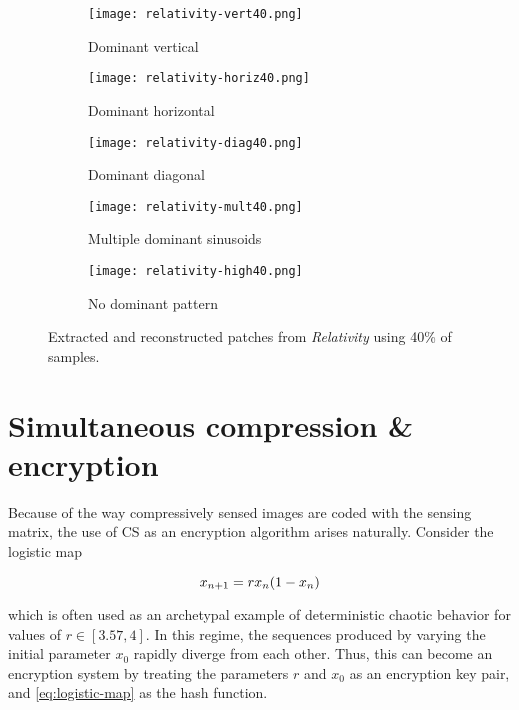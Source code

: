 \begin{figure}[htb]
	\centering
	\begin{subfigure}{\textwidth}
		\centering
		\texttt{[image: relativity-vert40.png]}
		\caption{Dominant vertical}
		\label{fig:relativity-vert40}
	\end{subfigure}
	\begin{subfigure}{\textwidth}
		\centering
		\texttt{[image: relativity-horiz40.png]}
		\caption{Dominant horizontal}
		\label{fig:relativity-horiz40}
	\end{subfigure}
	\begin{subfigure}{\textwidth}
		\centering
		\texttt{[image: relativity-diag40.png]}
		\caption{Dominant diagonal}
		\label{fig:relativity-diag40}
	\end{subfigure}
	\begin{subfigure}{\textwidth}
		\centering
		\texttt{[image: relativity-mult40.png]}
		\caption{Multiple dominant sinusoids}
		\label{fig:relativity-mult40}
	\end{subfigure}
	\begin{subfigure}{\textwidth}
		\centering
		\texttt{[image: relativity-high40.png]}
		\caption{No dominant pattern}
		\label{fig:relativity-high40}
	\end{subfigure}
	\caption{Extracted and reconstructed patches from \textit{Relativity} using 40\% of samples.}
	\label{fig:relativity-dominant-slices}
\end{figure}


\section{Simultaneous compression \& encryption}
Because of the way compressively sensed images are coded with the sensing matrix, the use of CS as an encryption algorithm arises naturally. Consider the logistic map

\begin{equation}\label{eq:logistic-map}
	x_{n+1} = r x_n \qty(1 - x_n)
\end{equation}

\noindent which is often used as an archetypal example of deterministic chaotic behavior for values of $r \in [3.57, 4]$. In this regime, the sequences produced by varying the initial parameter $x_0$ rapidly diverge from each other. Thus, this can become an encryption system by treating the parameters $r$ and $x_0$ as an encryption key pair, and \eqref{eq:logistic-map} as the hash function.

